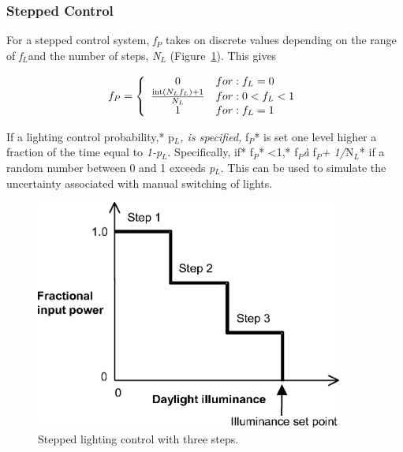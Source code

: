 \subsubsection{Stepped Control}\label{stepped-control}

For a stepped control system, \emph{f\(_{P}\)} takes on discrete values depending on the range of \emph{f\(_{L}\)}and the number of steps, \emph{N\(_{L}\)} (Figure~\ref{fig:stepped-lighting-control-with-three-steps.}). This gives

\begin{equation}
  f_P = \left\{
          \begin{array}{cl}
            0 & for: f_L = 0 \\
            \frac{\mathop{\rm int} (N_L f_L) + 1}{N_L} & for: 0 < f_L < 1 \\
            1 & for: f_L = 1
          \end{array}
         \right.
\end{equation}

If a lighting control probability,* p\(_{L}\)\emph{, is specified,} f\(_{P}\)* is set one level higher a fraction of the time equal to \emph{1-p\(_{L}\)}. Specifically, if* f\(_{P}\)* \textless{}1,* f\(_{P}\)\emph{à} f\(_{P}\)\emph{+ 1/}N\(_{L}\)* if a random number between 0 and 1 exceeds \emph{p\(_{L}\)}. This can be used to simulate the uncertainty associated with manual switching of lights.

\begin{figure}[hbtp] %
\centering
\includegraphics[width=0.9\textwidth, height=0.9\textheight, keepaspectratio=true]{media/image825.png}
\caption{Stepped lighting control with three steps. \protect \label{fig:stepped-lighting-control-with-three-steps.}}
\end{figure}

